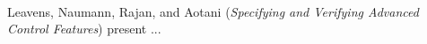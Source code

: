 

\ \hline \ %

Leavens, Naumann, Rajan, and Aotani
\cite{isola-2016-leavens}
({\em Specifying and Verifying Advanced Control Features})
present ...

